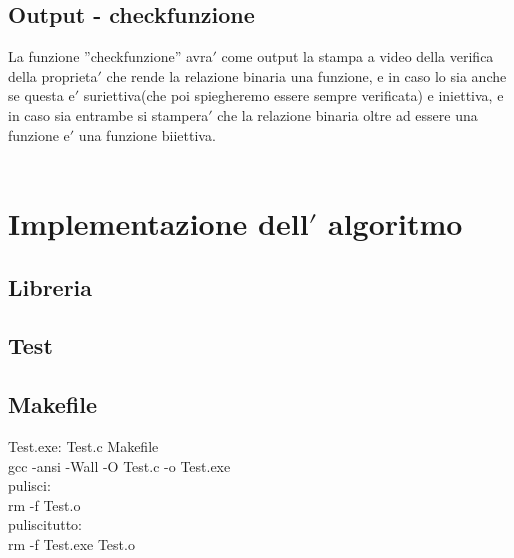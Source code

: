 \documentclass[11pt, a4paper, titlepage, block]{article}
\begin{document}
	\subsection{Output - check\textunderscore funzione}
	La funzione ”check\textunderscore funzione” avra$'$  come output la stampa a video della verifica della proprieta$'$  che rende la relazione binaria una funzione, e in caso lo sia anche se questa e$'$  suriettiva(che poi spiegheremo essere sempre verificata) e iniettiva, e in caso sia entrambe si stampera$'$  che la relazione binaria oltre ad essere una funzione e$'$  una funzione biiettiva.\\
	\\
	\newpage
	\section{Implementazione dell$'$ algoritmo}
	\subsection{Libreria}
	\lstset{numbers=left, tabsize=2,breaklines=true, language=C}
	 
	\newpage
	\subsection{Test}
	\lstset{numbers=left, tabsize=2,breaklines=true, language=C}
	
	\newpage
	\subsection{Makefile}
	Test.exe: Test.c Makefile\\
	gcc -ansi -Wall -O Test.c -o Test.exe\\
	pulisci:\\
	rm -f Test.o\\
	pulisci\textunderscore tutto:\\
	rm -f Test.exe Test.o\\
	
	
	
	
	
	
	
	\newpage
\end{document}
